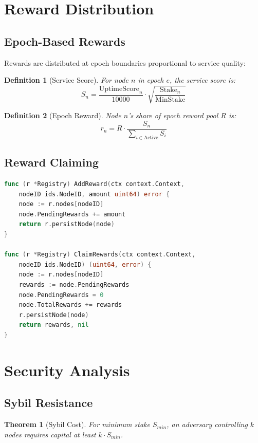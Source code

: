 \documentclass[11pt,a4paper]{article}
\newtheorem{theorem}{Theorem}
\newtheorem{definition}{Definition}
\begin{document}
\section{Reward Distribution}

\subsection{Epoch-Based Rewards}

Rewards are distributed at epoch boundaries proportional to service quality:

\begin{definition}[Service Score]
For node $n$ in epoch $e$, the service score is:
\[
S_n = \frac{\text{UptimeScore}_n}{10000} \cdot \sqrt{\frac{\text{Stake}_n}{\text{MinStake}}}
\]
\end{definition}

\begin{definition}[Epoch Reward]
Node $n$'s share of epoch reward pool $R$ is:
\[
r_n = R \cdot \frac{S_n}{\sum_{i \in \text{Active}} S_i}
\]
\end{definition}

\subsection{Reward Claiming}

\begin{lstlisting}[language=Go,caption={Reward Management}]
func (r *Registry) AddReward(ctx context.Context,
    nodeID ids.NodeID, amount uint64) error {
    node := r.nodes[nodeID]
    node.PendingRewards += amount
    return r.persistNode(node)
}

func (r *Registry) ClaimRewards(ctx context.Context,
    nodeID ids.NodeID) (uint64, error) {
    node := r.nodes[nodeID]
    rewards := node.PendingRewards
    node.PendingRewards = 0
    node.TotalRewards += rewards
    r.persistNode(node)
    return rewards, nil
}
\end{lstlisting}

\section{Security Analysis}

\subsection{Sybil Resistance}

\begin{theorem}[Sybil Cost]
For minimum stake $S_{min}$, an adversary controlling $k$ nodes requires capital at least $k \cdot S_{min}$.
\end{theorem}
\end{document}
